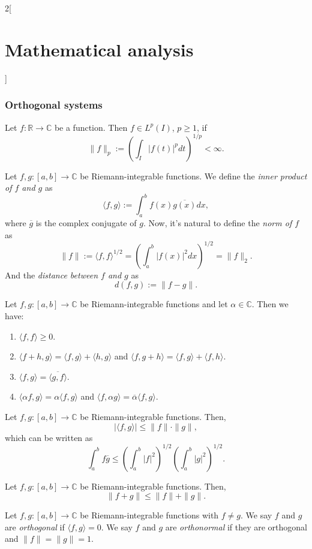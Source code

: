 \documentclass[class=article,crop=false]{standalone}
\begin{document}
\begin{multicols}{2}[\section{Mathematical analysis}]
\subsubsection*{Orthogonal systems}
\begin{definition}
Let $f:\mathbb{R}\rightarrow\mathbb{C}$ be a function. Then $f\in L^p(I)$, $p\geq1$, if $$\|f\|_p:=\left(\int_I|f(t)|^pdt\right)^{1/p}<\infty.$$ 
\end{definition}
\begin{definition}
Let $f,g:[a,b]\rightarrow\mathbb{C}$ be Riemann-integrable functions. We define the \textit{inner product of $f$ and $g$} as $$\langle f,g\rangle:=\int_a^bf(x)\overline{g(x)}dx,$$ where $\overline{g}$ is the complex conjugate of $g$. Now, it's natural to define the \textit{norm of $f$} as $$\|f\|:=\langle f,f\rangle^{1/2}=\left(\int_a^b|f(x)|^2dx\right)^{1/2}=\|f\|_2.$$ And the \textit{distance between $f$ and $g$} as $$d(f,g):=\|f-g\|.$$
\end{definition}
\begin{prop}
Let $f,g:[a,b]\rightarrow\mathbb{C}$ be Riemann-integrable functions and let $\alpha\in\mathbb{C}$. Then we have:
\begin{enumerate}
    \item $\langle f,f\rangle\geq 0$.
    \item $\langle f+h,g\rangle=\langle f,g\rangle+\langle h,g\rangle$ and $\langle f,g+h\rangle=\langle f,g\rangle+\langle f,h\rangle$.
    \item $\langle f,g\rangle=\overline{\langle g,f\rangle}$.
    \item $\langle \alpha f,g\rangle=\alpha\langle f,g\rangle$ and $\langle f,\alpha g\rangle=\overline{\alpha}\langle f,g\rangle$.
\end{enumerate}
\end{prop}
\begin{theorem}
Let $f,g:[a,b]\rightarrow\mathbb{C}$ be Riemann-integrable functions. Then, $$|\langle f,g\rangle|\leq\|f\|\cdot\|g\|,$$ which can be written as $$\int_a^bf\overline{g}\leq\left(\int_a^b|f|^2\right)^{1/2}\left(\int_a^b|g|^2\right)^{1/2}.$$
\end{theorem}
\begin{theorem}
Let $f,g:[a,b]\rightarrow\mathbb{C}$ be Riemann-integrable functions. Then, $$\| f+g\|\leq\|f\|+\|g\|.$$
\end{theorem}
\begin{definition}
Let $f,g:[a,b]\rightarrow\mathbb{C}$ be Riemann-integrable functions with $f\ne g$. We say $f$ and $g$ are \textit{orthogonal} if $\langle f,g\rangle=0$. We say $f$ and $g$ are \textit{orthonormal} if they are orthogonal and $\|f\|=\|g\|=1$.

\end{definition}
\end{multicols}
\end{document}
